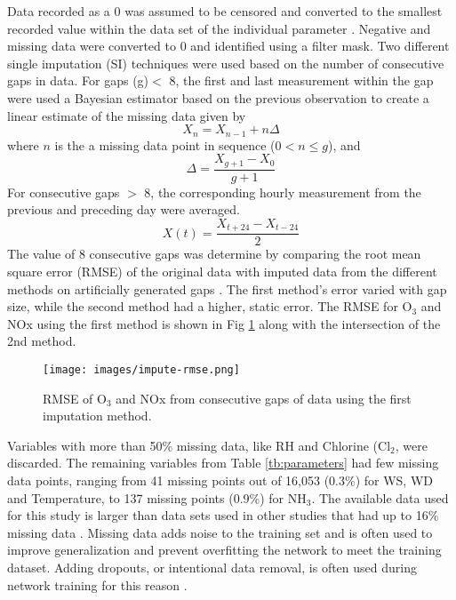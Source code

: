 \documentclass[preprint,12pt,authoryear]{elsarticle}
\begin{document}
\begin{linenumbers}
Data recorded as a 0 was assumed to be censored and converted to the smallest recorded value within the data set of the individual parameter \citep{Rana2015}. Negative and missing data were converted to 0 and identified using a filter mask. Two different single imputation (SI) techniques were used based on the number of consecutive gaps in data. For gaps (g)$<$ 8, the first and last measurement within the gap were used a Bayesian estimator based on the previous observation to create a linear estimate of the missing data given by 
%
\begin{equation}
\label{eq:impute1}
X_{n} = X_{n-1} + n\Delta
\end{equation}
%
where $n$ is the a missing data point in sequence ($0 < n \leq g$), and 
%
\begin{equation}
\label{eq:impute2}
\Delta = \frac{X_{g+1} - X_{0}}{g+1}
\end{equation}
%
For consecutive gaps $>$ 8, the corresponding hourly measurement from the previous and preceding day were averaged.
%
\begin{equation}
\label{eq:impute3}
X(t) = \frac{X_{t+24} - X_{t-24}}{2}
\end{equation}
%
The value of 8 consecutive gaps was determine by comparing the root mean square error (RMSE) of the original data with imputed data from the different methods on artificially generated gaps \citep{Junninen2004}. The first method's error varied with gap size, while the second method had a higher, static error. The RMSE for O$_{3}$ and NOx using the first method is shown in Fig \ref{fig:impute-rmse} along with the intersection of the 2nd method.
%
\begin{figure}[H]
\centering
\texttt{[image: images/impute-rmse.png]}  %
\caption{RMSE of O$_{3}$ and NOx from consecutive gaps of data using the first imputation method.}
\label{fig:impute-rmse}
\end{figure}
%
Variables with more than 50\% missing data, like RH and Chlorine (Cl$_{2}$, were discarded. The remaining variables from Table \ref{tb:parameters} had few missing data points, ranging from 41 missing points out of 16,053 (0.3\%) for WS, WD and Temperature, to 137 missing points (0.9\%) for NH$_{3}$. The available data used for this study is larger than data sets used in other studies that had up to 16\% missing data \citep{Taspinar2015}. Missing data adds noise to the training set and is often used to improve generalization and prevent overfitting the network to meet the training dataset. Adding dropouts, or intentional data removal, is often used during network training for this reason \citep{Srivastava2014}.


\end{linenumbers}
\end{document}
